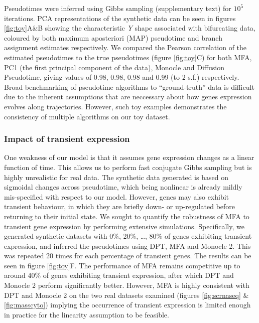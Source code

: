 Pseudotimes were inferred using Gibbs sampling (supplementary text) for $10^5$ iterations. PCA representations of the synthetic data can be seen in figures \ref{fig:toy}A\&B showing the characteristic \emph{Y} shape associated with bifurcating data, coloured by both maximum aposteriori (MAP) pseudotime and branch assignment estimates respectively. We compared the Pearson correlation of the estimated pseudotimes to the true pseudotimes (figure \ref{fig:toy}C) for both MFA, PC1 (the first principal component of the data), Monocle and Diffusion Pseudotime, giving values of 0.98, 0.98, 0.98 and 0.99 (to 2 s.f.) respectively. Broad benchmarking of pseudotime algorithms to ``ground-truth'' data is difficult due to the inherent assumptions that are neccessary about how genes expression evolves along trajectories. However, such toy examples demonstrates the consistency of multiple algorithms on our toy dataset.

\subsubsection{Impact of transient expression}

One weakness of our model is that it assumes gene expression changes as a linear function of time. This allows us to perform fast conjugate Gibbs sampling but is highly unrealistic for real data.
The synthetic data generated is based on sigmoidal changes across pseudotime, which being nonlinear is already mildly mis-specified with respect to our model.
However, genes may also exhibit transient behaviour, in which they are briefly down- or up-regulated before returning to their initial state. We sought to quantify the robustness of MFA to transient gene expression by performing extensive simulations. Specifically, we generated synthetic datasets with 0\%, 20\%, \ldots, 80\% of genes exhibiting transient expression, and inferred the pseudotimes using DPT, MFA and Monocle 2. This was repeated 20 times for each percentage of transient genes. The results can be seen in figure \ref{fig:toy}F. The performance of MFA remains competitive up to around 40\% of genes exhibiting transient expression, after which DPT and Monocle 2 perform significantly better. However, MFA is highly consistent with DPT and Monocle 2 on the two real datasets examined (figures \ref{fig:scrnaseq} \& \ref{fig:masscyto}) implying the occurrence of transient expression is limited enough in practice for the linearity assumption to be feasible.

